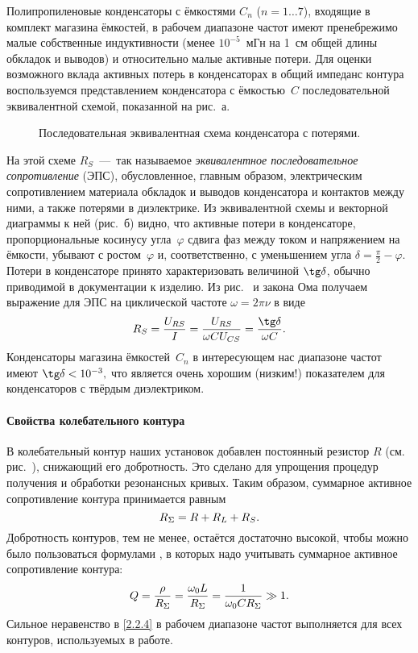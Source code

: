 Полипропиленовые конденсаторы с ёмкостями $C_n$ ($n=1\ldots7$), 
входящие в комплект магазина ёмкостей, в рабочем диапазоне частот имеют 
пренебрежимо малые собственные индуктивности (менее $10^{-5}$~мГн на 1~см общей длины обкладок и
выводов) и относительно малые активные потери. Для оценки возможного вклада
активных потерь в конденсаторах в общий импеданс контура воспользуемся
представлением конденсатора с ёмкостью~$C$ последовательной эквивалентной
схемой, показанной на рис.~а.
\begin{figure}[h!]
    \centering
	\caption{Последовательная эквивалентная схема конденсатора с потерями.}
\end{figure}
На этой схеме $R_S$~---~так называемое \emph{эквивалентное последовательное
сопротивление} (ЭПС), обусловленное, главным образом, электрическим
сопротивлением материала обкладок и выводов конденсатора и контактов между ними,
а также потерями в диэлектрике. Из эквивалентной схемы и векторной диаграммы к
ней (рис.~б) видно, что активные потери в конденсаторе,
пропорциональные косинусу угла~$\varphi$ сдвига фаз между током и
напряжением на ёмкости, убывают с ростом~$\varphi$ и, соответственно, с
уменьшением угла $\delta=\frac{\pi}{2}-\varphi$. Потери в конденсаторе принято
характеризовать величиной $\tg\delta$, обычно приводимой в документации к
изделию. Из рис.~ и закона Ома получаем 
выражение для ЭПС на циклической частоте $\omega=2\pi \nu$ в виде
\begin{equation}\eqmark{2.2.1}
R_S=\dfrac{U_{RS}}{I}=\dfrac{U_{RS}}{\omega CU_{CS}}=\dfrac{\tg\delta}{\omega C}.
\end{equation}
Конденсаторы магазина ёмкостей~$C_n$ в интересующем нас диапазоне частот имеют
$\tg\delta<10^{-3},$ что является очень хорошим (низким!) показателем для
конденсаторов с твёрдым диэлектриком.

\paragraph{Свойства колебательного контура}

В колебательный контур наших установок добавлен постоянный резистор $R$ (см.
рис.~), снижающий его добротность. Это сделано для упрощения
процедур получения и обработки резонансных кривых. Таким образом, суммарное
активное сопротивление контура принимается равным
\begin{equation}\eqmark{2.2.2}
	R_{\Sigma}=R+R_L+R_S.
\end{equation}
Добротность контуров, тем не менее, остаётся достаточно высокой, чтобы можно
было пользоваться формулами , в которых
надо учитывать суммарное активное сопротивление контура:
\begin{equation}\eqmark{2.2.3}
	Q=\frac{\rho}{R_{\Sigma}}=\frac{\omega_0L}{R_{\Sigma}}=
    \frac{1}{\omega_0CR_{\Sigma}}\gg 1.
\end{equation}
Сильное неравенство в \eqref{2.2.4} в рабочем диапазоне частот выполняется для
всех контуров, используемых в работе.


